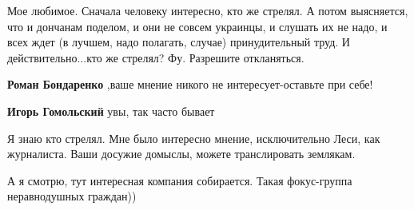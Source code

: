 \begin{itemize}
\begin{itemize}
 

Мое любимое. Сначала человеку интересно, кто же стрелял. А потом выясняется,
что и дончанам поделом, и они не совсем украинцы, и слушать их не надо, и всех
ждет (в лучшем, надо полагать, случае) принудительный труд. И
действительно...кто же стрелял? Фу. Разрешите откланяться.

 
\textbf{Роман Бондаренко} ,ваше мнение никого не интересует-оставьте при себе!

 
\textbf{Игорь Гомольский} увы, так часто бывает

 
Я знаю кто стрелял. Мне было интересно мнение, исключительно Леси, как журналиста. Ваши досужие домыслы, можете транслировать землякам.

 
А я смотрю, тут интересная компания собирается. Такая фокус-группа неравнодушных граждан))

 

\end{itemize}
\end{itemize}
